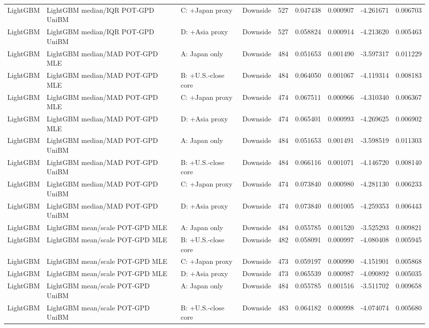 \begin{tabular}{lll lrrrrr}
LightGBM & LightGBM median/IQR POT-GPD UniBM & C: +Japan proxy & Downside & 527 & 0.047438 & 0.000907 & -4.261671 & 0.006703 \\
LightGBM & LightGBM median/IQR POT-GPD UniBM & D: +Asia proxy & Downside & 527 & 0.058824 & 0.000914 & -4.213620 & 0.005463 \\
LightGBM & LightGBM median/MAD POT-GPD MLE & A: Japan only & Downside & 484 & 0.051653 & 0.001490 & -3.597317 & 0.011229 \\
LightGBM & LightGBM median/MAD POT-GPD MLE & B: +U.S.-close core & Downside & 484 & 0.064050 & 0.001067 & -4.119314 & 0.008183 \\
LightGBM & LightGBM median/MAD POT-GPD MLE & C: +Japan proxy & Downside & 474 & 0.067511 & 0.000966 & -4.310340 & 0.006367 \\
LightGBM & LightGBM median/MAD POT-GPD MLE & D: +Asia proxy & Downside & 474 & 0.065401 & 0.000993 & -4.269625 & 0.006902 \\
LightGBM & LightGBM median/MAD POT-GPD UniBM & A: Japan only & Downside & 484 & 0.051653 & 0.001491 & -3.598519 & 0.011303 \\
LightGBM & LightGBM median/MAD POT-GPD UniBM & B: +U.S.-close core & Downside & 484 & 0.066116 & 0.001071 & -4.146720 & 0.008140 \\
LightGBM & LightGBM median/MAD POT-GPD UniBM & C: +Japan proxy & Downside & 474 & 0.073840 & 0.000980 & -4.281130 & 0.006233 \\
LightGBM & LightGBM median/MAD POT-GPD UniBM & D: +Asia proxy & Downside & 474 & 0.073840 & 0.001005 & -4.259353 & 0.006443 \\
LightGBM & LightGBM mean/scale POT-GPD MLE & A: Japan only & Downside & 484 & 0.055785 & 0.001520 & -3.525293 & 0.009821 \\
LightGBM & LightGBM mean/scale POT-GPD MLE & B: +U.S.-close core & Downside & 482 & 0.058091 & 0.000997 & -4.080408 & 0.005945 \\
LightGBM & LightGBM mean/scale POT-GPD MLE & C: +Japan proxy & Downside & 473 & 0.059197 & 0.000990 & -4.151901 & 0.005868 \\
LightGBM & LightGBM mean/scale POT-GPD MLE & D: +Asia proxy & Downside & 473 & 0.065539 & 0.000987 & -4.090892 & 0.005035 \\
LightGBM & LightGBM mean/scale POT-GPD UniBM & A: Japan only & Downside & 484 & 0.055785 & 0.001516 & -3.511702 & 0.009658 \\
LightGBM & LightGBM mean/scale POT-GPD UniBM & B: +U.S.-close core & Downside & 483 & 0.064182 & 0.000998 & -4.074074 & 0.005680 \\

\end{tabular}
